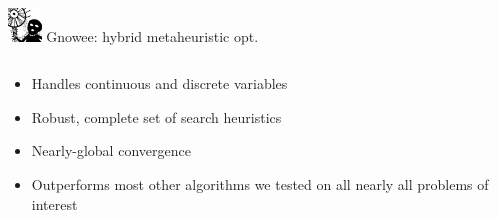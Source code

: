 \documentclass[xcolor=x11names,compress]{beamer}
\renewcommand{\(}{\begin{columns}}
\renewcommand{\)}{\end{columns}}
\newcommand{\<}[1]{\begin{column}{#1}}
\renewcommand{\>}{\end{column}}
\begin{document}
\begin{frame}{\includegraphics[width=0.35in]{../figs/Gnowee.png} \hspace{0.25cm}  Gnowee: hybrid metaheuristic opt.}
  \begin{columns}
    \begin{column}{0.6\linewidth}
      \vspace{-0.75cm}
      \begin{itemize}
        \item Handles continuous and discrete variables \newline
        \item Robust, complete set of search heuristics \newline
        \item Nearly-global convergence \newline
        \item Outperforms most other algorithms we tested on all nearly all problems of interest
      \end{itemize} 
    \end{column}
    

\end{columns}
\end{frame}
\end{document}
